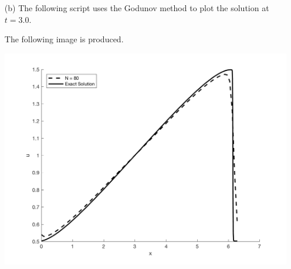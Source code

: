\documentclass[11pt, oneside]{article}
\begin{document}
\begin{enumerate}
\begin{enumerate}
      \item[(b)] %
        The following script uses the Godunov method to plot the solution
        at $t = 3.0$.
        
        The following image is produced.
        \begin{center}
          \includegraphics[scale=0.7]{Figures/05_01.png}
        \end{center}
    \end{enumerate}
\end{enumerate}
\end{document}
